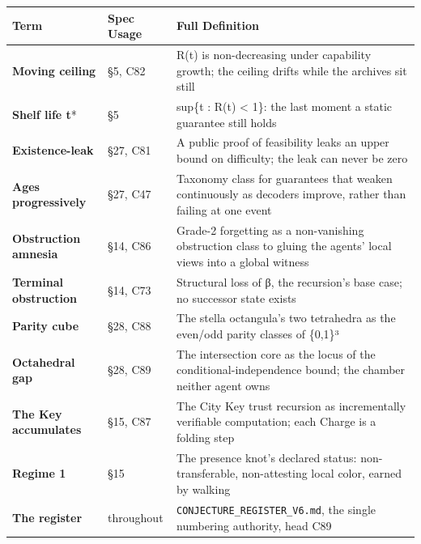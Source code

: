 \documentclass[
]{article}
\newcounter{none} %
\begin{document}
{\def\LTcaptype{none} %
\begin{longtable}[]{@{}
  >{\raggedright\arraybackslash}p{}
  >{\raggedright\arraybackslash}p{}
  >{\raggedright\arraybackslash}p{}@{}}
\toprule\noalign{}
\begin{minipage}[b]{\linewidth}\raggedright
Term
\end{minipage} & \begin{minipage}[b]{\linewidth}\raggedright
Spec Usage
\end{minipage} & \begin{minipage}[b]{\linewidth}\raggedright
Full Definition
\end{minipage} \\
\midrule\noalign{}
\endhead
\bottomrule\noalign{}
\endlastfoot
\textbf{Moving ceiling} & §5, C82 & R(t) is non-decreasing under
capability growth; the ceiling drifts while the archives sit still \\
\textbf{Shelf life t}* & §5 & sup\{t : R(t) \textless{} 1\}: the last
moment a static guarantee still holds \\
\textbf{Existence-leak} & §27, C81 & A public proof of feasibility leaks
an upper bound on difficulty; the leak can never be zero \\
\textbf{Ages progressively} & §27, C47 & Taxonomy class for guarantees
that weaken continuously as decoders improve, rather than failing at one
event \\
\textbf{Obstruction amnesia} & §14, C86 & Grade-2 forgetting as a
non-vanishing obstruction class to gluing the agents' local views into a
global witness \\
\textbf{Terminal obstruction} & §14, C73 & Structural loss of β, the
recursion's base case; no successor state exists \\
\textbf{Parity cube} & §28, C88 & The stella octangula's two tetrahedra
as the even/odd parity classes of \{0,1\}³ \\
\textbf{Octahedral gap} & §28, C89 & The intersection core as the locus
of the conditional-independence bound; the chamber neither agent owns \\
\textbf{The Key accumulates} & §15, C87 & The City Key trust recursion
as incrementally verifiable computation; each Charge is a folding
step \\
\textbf{Regime 1} & §15 & The presence knot's declared status:
non-transferable, non-attesting local color, earned by walking \\
\textbf{The register} & throughout &
\texttt{CONJECTURE\_REGISTER\_V6.md}, the single numbering authority,
head C89 \\
\end{longtable}
}
\end{document}
